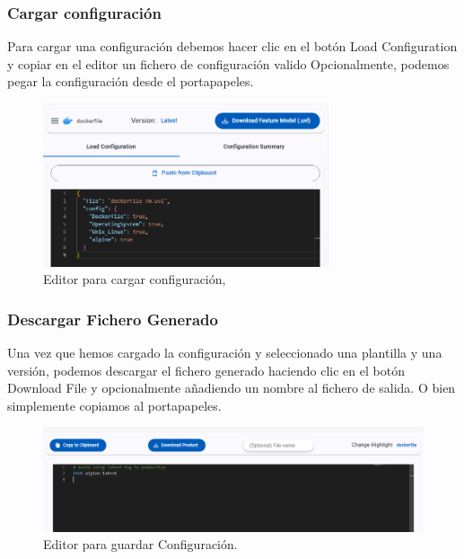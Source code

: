 \documentclass[12pt, a4paper, twoside]{article}
\begin{document}
\begin{umaappendices}
	\subsubsection{Cargar configuración}
	Para cargar una configuración debemos hacer clic en el botón Load Configuration y copiar en el editor un fichero de configuración valido
	Opcionalmente, podemos pegar la configuración desde el portapapeles.
	\begin{figure}[h]
		\centering
			\includegraphics[width=0.75\textwidth]{loadconfiguration.png}
		\caption{Editor para cargar configuración,}
	\end{figure}
	\newpage

	\subsubsection{Descargar Fichero Generado}
	Una vez que hemos cargado la configuración y seleccionado una plantilla y una versión, podemos descargar el fichero generado haciendo clic en el botón Download File y opcionalmente añadiendo un nombre al fichero de salida. O bien simplemente copiamos al portapapeles.
	\begin{figure}[h]
		\centering
			\includegraphics[width=1\textwidth]{donwloadToolbar.png}
		\caption{Editor para guardar Configuración.}
	\end{figure}


	\newpage

\end{umaappendices}
\end{document}
